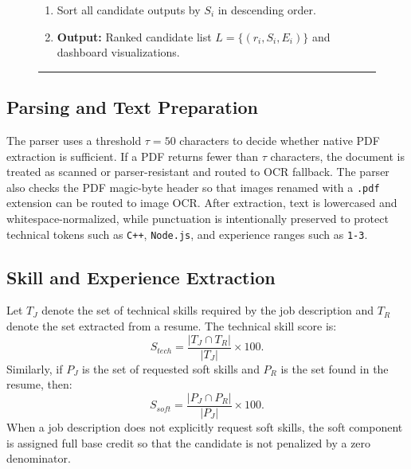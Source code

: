 \begin{figure}[!ht]
\begin{enumerate}
\begin{enumerate}
        \item Compute capped extra-skill bonus from skills present in resume but absent in the job description.
        \item Calculate final weighted score \(S_i\).
        \item Generate explanation \(E_i\) from matched, missing, bonus, and score-breakdown fields.
    \end{enumerate}
    \item Sort all candidate outputs by \(S_i\) in descending order.
    \item \textbf{Output:} Ranked candidate list \(L=\{(r_i,S_i,E_i)\}\) and dashboard visualizations.
\end{enumerate}
\vspace{2pt}
\hrule
\end{figure}

\subsection{Parsing and Text Preparation}
The parser uses a threshold \(\tau=50\) characters to decide whether native PDF extraction is sufficient. If a PDF returns fewer than \(\tau\) characters, the document is treated as scanned or parser-resistant and routed to OCR fallback. The parser also checks the PDF magic-byte header so that images renamed with a \texttt{.pdf} extension can be routed to image OCR. After extraction, text is lowercased and whitespace-normalized, while punctuation is intentionally preserved to protect technical tokens such as \texttt{C++}, \texttt{Node.js}, and experience ranges such as \texttt{1-3}.

\subsection{Skill and Experience Extraction}
Let \(T_J\) denote the set of technical skills required by the job description and \(T_R\) denote the set extracted from a resume. The technical skill score is:
\begin{equation}
S_{tech}=\frac{|T_J \cap T_R|}{|T_J|}\times 100.
\end{equation}
Similarly, if \(P_J\) is the set of requested soft skills and \(P_R\) is the set found in the resume, then:
\begin{equation}
S_{soft}=\frac{|P_J \cap P_R|}{|P_J|}\times 100.
\end{equation}
When a job description does not explicitly request soft skills, the soft component is assigned full base credit so that the candidate is not penalized by a zero denominator.

